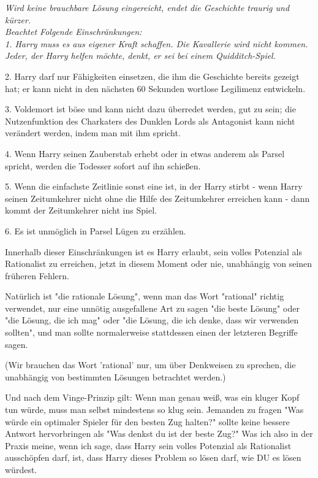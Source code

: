 {\emph{Wird keine brauchbare Lösung eingereicht, endet die Geschichte traurig und kürzer.}\\ \emph{\hfill\break Beachtet Folgende Einschränkungen:\\ 1. Harry muss es aus eigener Kraft schaffen. Die Kavallerie wird nicht kommen. Jeder, der Harry helfen möchte, denkt, er sei bei einem Quidditch-Spiel.}

2. Harry darf nur Fähigkeiten einsetzen, die ihm die Geschichte bereits gezeigt hat; er kann nicht in den nächsten 60 Sekunden wortlose Legilimenz entwickeln.

3. Voldemort ist böse und kann nicht dazu überredet werden, gut zu sein; die Nutzenfunktion des Charkaters des Dunklen Lords als Antagonist kann nicht verändert werden, indem man mit ihm spricht.

4. Wenn Harry seinen Zauberstab erhebt oder in etwas anderem als Parsel spricht, werden die Todesser sofort auf ihn schießen.

5. Wenn die einfachste Zeitlinie sonst eine ist, in der Harry stirbt - wenn Harry seinen Zeitumkehrer nicht ohne die Hilfe des Zeitumkehrer erreichen kann - dann kommt der Zeitumkehrer nicht ins Spiel.

6. Es ist unmöglich in Parsel Lügen zu erzählen.

Innerhalb dieser Einschränkungen ist es Harry erlaubt, sein volles Potenzial als Rationalist zu erreichen, jetzt in diesem Moment oder nie, unabhängig von seinen früheren Fehlern.

Natürlich ist "die rationale Lösung", wenn man das Wort "rational" richtig verwendet, nur eine unnötig ausgefallene Art zu sagen "die beste Lösung" oder "die Lösung, die ich mag" oder "die Lösung, die ich denke, dass wir verwenden sollten", und man sollte normalerweise stattdessen einen der letzteren Begriffe sagen.

(Wir brauchen das Wort 'rational' nur, um über Denkweisen zu sprechen, die unabhängig von bestimmten Lösungen betrachtet werden.)

Und nach dem Vinge-Prinzip gilt: Wenn man genau weiß, was ein kluger Kopf tun würde, muss man selbst mindestens so klug sein. Jemanden zu fragen "Was würde ein optimaler Spieler für den besten Zug halten?" sollte keine bessere Antwort hervorbringen als "Was denkst du ist der beste Zug?" Was ich also in der Praxis meine, wenn ich sage, dass Harry sein volles Potenzial als Rationalist ausschöpfen darf, ist, dass Harry dieses Problem so lösen darf, wie DU es lösen würdest.

}
